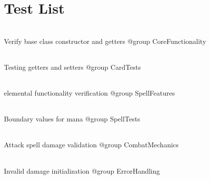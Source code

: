 \chapter{Test List}
\hypertarget{test}{}\label{test}

\begin{DoxyRefList}
\item[Member \doxylink{test-card_8cpp_afeb6d4047a9b58aca40a22b0e710266a}{TEST} (Card\+Basic\+Test, Constructor\+And\+Getters)]\hfill \\
\label{test__test000001}%
%
Verify base  class constructor and getters @group Core\+Functionality  
\item[Member \doxylink{test-card_8cpp_a880e202bb1b4b19e41edd12692dd282f}{TEST} (Card\+Basic\+Test, Setters\+Validation)]\hfill \\
\label{test__test000002}%
%
Testing getters and setters @group Card\+Tests  
\item[Member \doxylink{test-card_8cpp_ae975df4617bfe3142fbf1bbaf2b7060a}{TEST} (Spell\+Card\+Test, Inheritance\+And\+Element\+Handling)]\hfill \\
\label{test__test000003}%
%
 elemental functionality verification @group Spell\+Features  
\item[Member \doxylink{test-card_8cpp_a92a2c114f065ab3055be1d27920b91f1}{TEST} (Spell\+Card\+Test, Mana\+Boundary\+Cases)]\hfill \\
\label{test__test000004}%
%
Boundary values for mana @group Spell\+Tests  
\item[Member \doxylink{test-card_8cpp_a8cd2d182df39ce141fa84259f8cb46c8}{TEST} (Attack\+Spell\+Test, Damage\+Management)]\hfill \\
\label{test__test000005}%
%
Attack spell damage validation @group Combat\+Mechanics  
\item[Member \doxylink{test-card_8cpp_aba0011ba7054595b83c46b7f89d33a59}{TEST} (Attack\+Spell\+Test, Invalid\+Damage\+Throws)]\hfill \\
\label{test__test000006}%
%
Invalid damage initialization @group Error\+Handling 
\end{DoxyRefList}